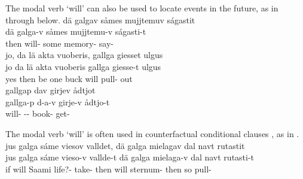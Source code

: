 The modal verb  ‘will’ can also be used to locate events in the future, as in  through  below.
\ea\label{future1}%
\glll	dä galgav såmes mujjtemuv ságastit\\
	dä galga-v såmes mujjtemu-v ságasti-t\\
	then will- some memory- say-\\\nopagebreak
{} 
\z
\ea\label{future2}%
\glll	jo, da lä akta vuoberis, gallga giesset ulgus\\
	jo da lä akta {vuoberis\footnotemark} gallga giesse-t ulgus\\
	yes then be\BS{} one buck\BS{} will\BS{} pull- out\\\nopagebreak
{} 
\z
\ea\label{future3}%
\glll	gallgap dav girjev ådtjot\\
	gallga-p d-a-v girje-v ådtjo-t\\
	will- -- book- get-\\\nopagebreak
{} 
\z

The modal verb  ‘will’ is often used in counterfactual conditional clauses%
, as in .
\ea\label{condClause1}%
\glll	jus galga sáme viesov valldet, dä galga mielagav dal navt rutastit\\
	jus galga sáme vieso-v vallde-t dä galga mielaga-v dal navt rutasti-t\\
	if will\BS{} Saami\BS{} life?- take- then will\BS{} sternum- then so pull-\\\nopagebreak
{} 
\z


